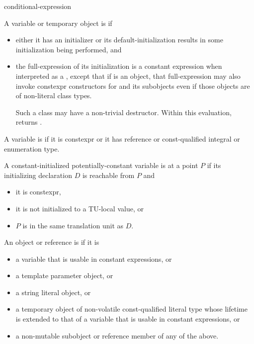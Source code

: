 \begin{bnf}
\br
    conditional-expression
\end{bnf}

\pnum
A variable or temporary object  is  if
\begin{itemize}
\item
  either it has an initializer or
  its default-initialization results in some initialization being performed, and
\item
  the full-expression of its initialization is a constant expression
  when interpreted as a ,
  except that if  is an object,
  that full-expression
  may also invoke constexpr constructors
  for  and its subobjects
  even if those objects are of non-literal class types.
  \begin{note}
  Such a class may have a non-trivial destructor.
  Within this evaluation,
  returns .
\end{note}
\end{itemize}

\pnum
A variable is  if
it is constexpr or
it has reference or const-qualified integral or enumeration type.

\pnum
A constant-initialized potentially-constant variable is
 at a point $P$ if
its initializing declaration $D$ is reachable from $P$ and
\begin{itemize}
\item it is constexpr,
\item it is not initialized to a TU-local value, or
\item $P$ is in the same translation unit as $D$.
\end{itemize}
An object or reference is  if it is
\begin{itemize}
\item a variable that is usable in constant expressions, or
\item a template parameter object, or
\item a string literal object, or
\item a temporary object of non-volatile const-qualified literal type
  whose lifetime is extended
  to that of a variable that is usable in constant expressions, or
\item a non-mutable subobject or reference member of any of the above.
\end{itemize}

